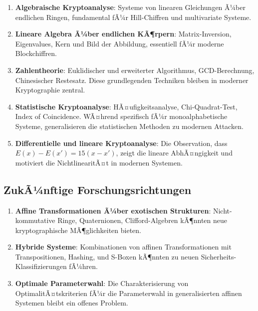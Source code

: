 ﻿\documentclass[12pt,a4paper]{article}
\begin{document}
	\begin{enumerate}
		\item \textbf{Algebraische Kryptoanalyse}: Systeme von linearen Gleichungen Ã¼ber endlichen Ringen, fundamental fÃ¼r Hill-Chiffren und multivariate Systeme.
		
		\item \textbf{Lineare Algebra Ã¼ber endlichen KÃ¶rpern}: Matrix-Inversion, Eigenvalues, Kern und Bild der Abbildung, essentiell fÃ¼r moderne Blockchiffren.
		
		\item \textbf{Zahlentheorie}: Euklidischer und erweiterter Algorithmus, GCD-Berechnung, Chinesischer Restesatz. Diese grundlegenden Techniken bleiben in moderner Kryptographie zentral.
		
		\item \textbf{Statistische Kryptoanalyse}: HÃ¤ufigkeitsanalyse, Chi-Quadrat-Test, Index of Coincidence. WÃ¤hrend spezifisch fÃ¼r monoalphabetische Systeme, generalisieren die statistischen Methoden zu modernen Attacken.
		
		\item \textbf{Differentielle und lineare Kryptoanalyse}: Die Observation, dass $E(x) - E(x') = 15(x - x')$, zeigt die lineare AbhÃ¤ngigkeit und motiviert die NichtlinearitÃ¤t in modernen Systemen.
	\end{enumerate}
	
	\subsection{ZukÃ¼nftige Forschungsrichtungen}
	
	\begin{enumerate}
		\item \textbf{Affine Transformationen Ã¼ber exotischen Strukturen}: Nicht-kommutative Ringe, Quaternionen, Clifford-Algebren kÃ¶nnten neue kryptographische MÃ¶glichkeiten bieten.
		
		\item \textbf{Hybride Systeme}: Kombinationen von affinen Transformationen mit Transpositionen, Hashing, und S-Boxen kÃ¶nnten zu neuen Sicherheits-Klassifizierungen fÃ¼hren.
		
		\item \textbf{Optimale Parameterwahl}: Die Charakterisierung von OptimalitÃ¤tskriterien fÃ¼r die Parameterwahl in generalisierten affinen Systemen bleibt ein offenes Problem.
	\end{enumerate}
	
\end{document}
